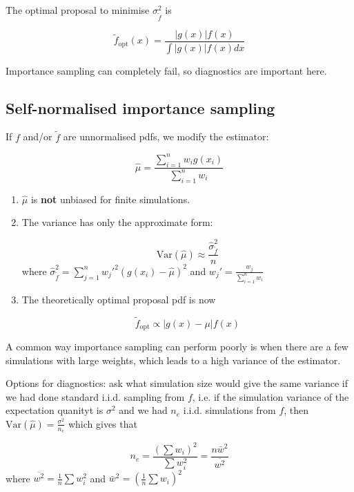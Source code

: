 The optimal proposal to minimise $\sigma_{\tilde{f}}^2$ is

\[ \tilde{f}_{\text{opt}} (x) = \frac{|g(x)| f(x)}{\int |g(x)| f(x) dx} \]

\begin{remark}
	Importance sampling can completely fail, so diagnostics are important here.
\end{remark}

\subsection{Self-normalised importance sampling}

\begin{definition}
	If $f$ and/or $\tilde{f}$ are unnormalised pdfs, we modify the estimator:

	\[ \hat{\mu} = \frac{\sum_{i = 1}^n w_i g(x_i)}{\sum_{i = 1}^n w_i} \]
\end{definition}

\begin{remark}
	\hfill
	\begin{enumerate}
		\item $\hat{\mu}$ is \textbf{not} unbiased for finite simulations.
		\item The variance has only the approximate form:
		
		\[ \text{Var}(\hat{\mu}) \approx \frac{\hat{\sigma}_{\tilde{f}}^2}{n} \]
		where $\hat{\sigma}_{\tilde{f}}^2 = \sum_{j = 1}^n w_j'^2 (g(x_i) - \hat{\mu})^2$ and $w_j' = \frac{w_j}{\sum_{i = 1}^n w_i}$
		\item The theoretically optimal proposal pdf is now
		
		\[ \tilde{f}_{\text{opt}} \propto |g(x) - \mu| f(x) \]
	\end{enumerate}
\end{remark}

\begin{remark}
	A common way importance sampling can perform poorly is when there are a few simulations with large weights, which leads to a high variance of the estimator.
	
	Options for diagnostics: ask what simulation size would give the same variance if we had done standard i.i.d. sampling from $f$, i.e. if the simulation variance of the expectation quanityt is $\sigma^2$ and we had $n_e$ i.i.d. simulations from $f$, then $\text{Var}(\hat{\mu}) = \frac{\sigma^2}{n_e}$ which gives that

	\[ n_e = \frac{{\left(\sum w_i \right)}^2}{\sum w_i^2} = \frac{n \bar{w}^2}{\overline{w^2}} \]
	where $\overline{w^2} = \frac{1}{n} \sum w_i^2$ and $\bar{w}^2 = {\left(\frac{1}{n} \sum w_i\right)}^2$
\end{remark}

